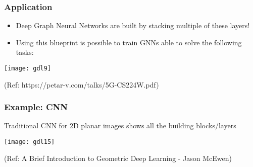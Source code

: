 \begin{frame}[fragile]\frametitle{Application}


\begin{itemize}
\item Deep Graph Neural Networks are built by stacking multiple of these layers!
\item Using this blueprint is possible to train GNNs able to solve the following tasks:
\end{itemize}
	
\begin{center}
\texttt{[image: gdl9]}
\end{center}

{\tiny (Ref: https://petar-v.com/talks/5G-CS224W.pdf)}	

\end{frame}


\begin{frame}[fragile]\frametitle{Example: CNN}

Traditional CNN for 2D planar images shows all the building blocks/layers

\begin{center}
\texttt{[image: gdl15]}
\end{center}


{\tiny (Ref: A Brief Introduction to Geometric Deep Learning - Jason McEwen)}

\end{frame}


